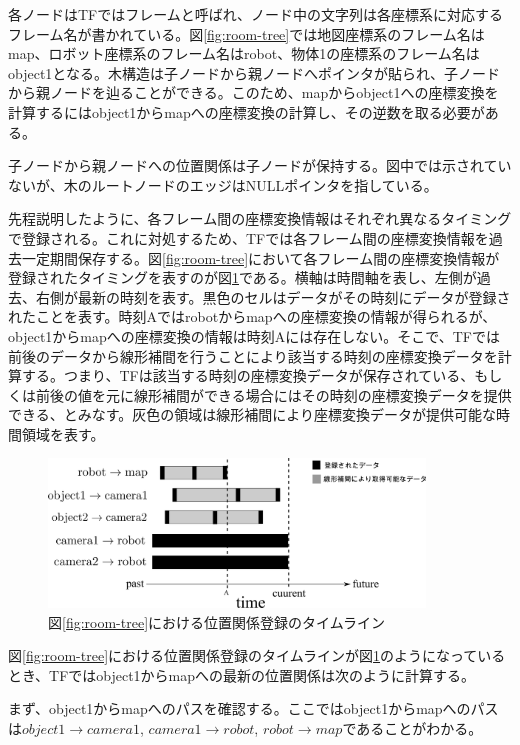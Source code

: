 \documentclass[a4paper]{jreport}	%
\begin{document}
各ノードはTFではフレームと呼ばれ、ノード中の文字列は各座標系に対応するフレーム名が書かれている。図\ref{fig:room-tree}では地図座標系のフレーム名はmap、ロボット座標系のフレーム名はrobot、物体1の座標系のフレーム名はobject1となる。木構造は子ノードから親ノードへポインタが貼られ、子ノードから親ノードを辿ることができる。このため、mapからobject1への座標変換を計算するにはobject1からmapへの座標変換の計算し、その逆数を取る必要がある。

子ノードから親ノードへの位置関係は子ノードが保持する。図中では示されていないが、木のルートノードのエッジはNULLポインタを指している。

先程説明したように、各フレーム間の座標変換情報はそれぞれ異なるタイミングで登録される。これに対処するため、TFでは各フレーム間の座標変換情報を過去一定期間保存する。図\ref{fig:room-tree}において各フレーム間の座標変換情報が登録されたタイミングを表すのが図\ref{fig:room-timeline}である。横軸は時間軸を表し、左側が過去、右側が最新の時刻を表す。黒色のセルはデータがその時刻にデータが登録されたことを表す。時刻Aではrobotからmapへの座標変換の情報が得られるが、object1からmapへの座標変換の情報は時刻Aには存在しない。そこで、TFでは前後のデータから線形補間を行うことにより該当する時刻の座標変換データを計算する。つまり、TFは該当する時刻の座標変換データが保存されている、もしくは前後の値を元に線形補間ができる場合にはその時刻の座標変換データを提供できる、とみなす。灰色の領域は線形補間により座標変換データが提供可能な時間領域を表す。

\begin{figure}[h] 
\centering
\includegraphics[width=10cm]{room-timeline}	
\caption{図\ref{fig:room-tree}における位置関係登録のタイムライン}
\label{fig:room-timeline}
\end{figure}

図\ref{fig:room-tree}における位置関係登録のタイムラインが図\ref{fig:room-timeline}のようになっているとき、TFではobject1からmapへの最新の位置関係は次のように計算する。

まず、object1からmapへのパスを確認する。ここではobject1からmapへのパスは$object1 \rightarrow camera1$, $camera1 \rightarrow robot$, $robot \rightarrow map$であることがわかる。
\end{document}
